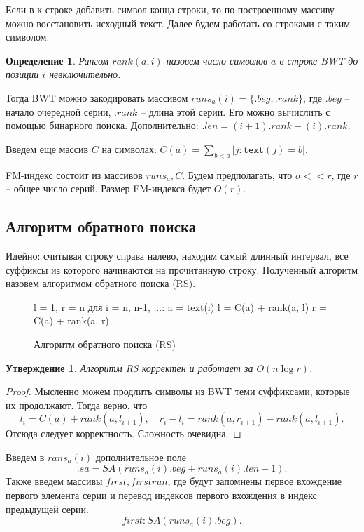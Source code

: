 \documentclass[10pt]{book}
\theoremstyle{plain}
\newtheorem{stm}{Утверждение}[section]
\newtheorem{definition}{Определение}[section]
\newcommand{\textm}{\texttt{text}}
\newenvironment{figurem}[1][]
  {\begin{figure}[p]
  \caption{#1}
  \centering
  }
  {
  \end{figure}
  }
\begin{document}
Если в к строке добавить символ конца строки, то по построенному массиву можно
восстановить исходный текст. Далее будем работать со строками с таким символом.

\begin{definition}
  Рангом $rank(a, i)$ назовем число символов $a$ в строке BWT до
  позиции $i$ невключительно.
\end{definition}

Тогда BWT можно закодировать массивом $runs_a(i) = \{.beg, .rank\}$, где 
$.beg$ -- начало очередной серии, $.rank$ -- длина этой серии. Его можно
вычислить с помощью бинарного поиска. Дополнительно: $.len = (i+1).rank - (i).rank$.

Введем еще массив $C$ на символах: $C(a) = \sum_{b < a} |j : \textm(j) = b|$.

FM-индекс состоит из массивов $runs_a, C$. Будем предполагать, что
$\sigma << r$, где $r$ -- общее число серий. Размер FM-индекса будет $O(r)$.

\subsection{Алгоритм обратного поиска}

Идейно: считывая строку справа налево, находим самый длинный интервал, все
суффиксы из которого начинаются на прочитанную строку. Полученный алгоритм
назовем алгоритмом обратного поиска (RS).

\begin{figurem}[Алгоритм обратного поиска (RS)]
\begin{verbm}
  l = 1, r = n
  для i = n, n-1, ...:
    a = text(i)
    l = C(a) + rank(a, l)
    r = C(a) + rank(a, r)
\end{verbm}
\end{figurem}

\begin{stm}
  Алгоритм RS корректен и работает за $O(n \log r)$.
\end{stm}
\begin{proof}
  Мысленно можем продлить символы из BWT теми суффиксами, которые их продолжают.
  Тогда верно, что 
  $$l_i = C(a) + rank(a, l_{i+1}), \quad r_i - l_i = rank(a, r_{i+1}) - rank(a, l_{i+1}).$$
  Отсюда следует корректность. Сложность очевидна.
\end{proof}

Введем в $rans_a(i)$ дополнительное поле 
$$.sa = SA(runs_a(i).beg + runs_a(i).len - 1).$$
Также введем массивы $first, firstrun$, где будут запомнены первое вхождение
первого элемента серии и перевод индексов первого вхождения в индекс предыдущей
серии.
$$first : SA(runs_a(i).beg).$$
\end{document}
